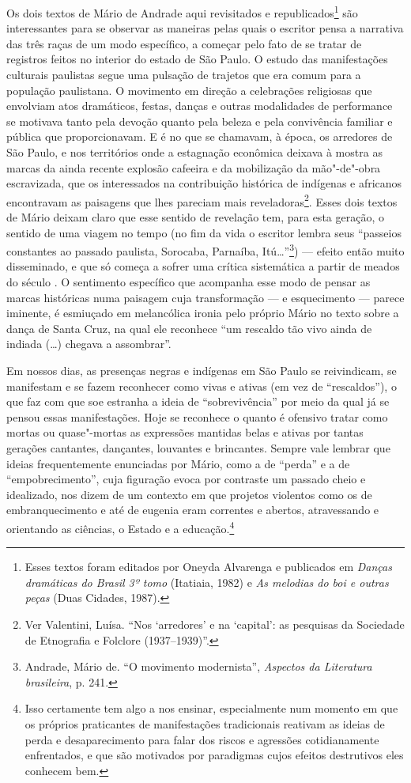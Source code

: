 Os dois textos de Mário de Andrade aqui revisitados e
republicados\footnote{Esses textos foram editados por Oneyda Alvarenga e
  publicados em \emph{Danças dramáticas do Brasil 3º tomo} (Itatiaia,
  1982) e \emph{As melodias do boi e outras peças} (Duas Cidades, 1987).}
são interessantes para se observar as maneiras pelas quais o escritor
pensa a narrativa das três raças de um modo específico, a começar pelo
fato de se tratar de registros feitos no interior do estado de São
Paulo. O estudo das manifestações culturais paulistas segue uma pulsação
de trajetos que era comum para a população paulistana. O movimento em
direção a celebrações religiosas que envolviam atos dramáticos, festas,
danças e outras modalidades de performance se motivava tanto pela
devoção quanto pela beleza e pela convivência familiar e pública que
proporcionavam. E é no que se chamavam, à época, os arredores de São
Paulo, e nos territórios onde a estagnação econômica deixava à mostra as
marcas da ainda recente explosão cafeeira e da mobilização da
mão"-de"-obra escravizada, que os interessados na contribuição histórica
de indígenas e africanos encontravam as paisagens que lhes pareciam mais
reveladoras\footnote{Ver Valentini, Luísa. ``Nos `arredores' e na
  `capital': as pesquisas da Sociedade de Etnografia e Folclore
  (1937--1939)''.}. Esses dois textos de Mário deixam claro que esse
sentido de revelação tem, para esta geração, o sentido de uma viagem no
tempo (no fim da vida o escritor lembra seus ``passeios constantes ao
passado paulista, Sorocaba, Parnaíba, Itú\ldots{}''\footnote{Andrade, Mário
  de. ``O movimento modernista'', \emph{Aspectos da Literatura
  brasileira}, p. 241.}) --- efeito então muito disseminado, e que só
começa a sofrer uma crítica sistemática a partir de meados do século .
O sentimento específico que acompanha esse modo de pensar as marcas
históricas numa paisagem cuja transformação --- e esquecimento --- parece
iminente, é esmiuçado em melancólica ironia pelo próprio Mário no texto
sobre a dança de Santa Cruz, na qual ele reconhece ``um rescaldo tão
vivo ainda de indiada (\ldots{}) chegava a assombrar''.

Em nossos dias, as presenças negras e indígenas em São Paulo se
reivindicam, se manifestam e se fazem reconhecer como vivas e ativas (em
vez de ``rescaldos''), o que faz com que soe estranha a ideia de
``sobrevivência'' por meio da qual já se pensou essas manifestações.
Hoje se reconhece o quanto é ofensivo tratar como mortas ou quase"-mortas
as expressões mantidas belas e ativas por tantas gerações cantantes,
dançantes, louvantes e brincantes. Sempre vale lembrar que ideias
frequentemente enunciadas por Mário, como a de ``perda'' e a de
``empobrecimento'', cuja figuração evoca por contraste um passado cheio
e idealizado, nos dizem de um contexto em que projetos violentos como os
de embranquecimento e até de eugenia eram
correntes e abertos, atravessando e orientando as ciências, o Estado e a
educação.\footnote{Isso certamente tem algo a nos ensinar, especialmente
  num momento em que os próprios praticantes de manifestações
  tradicionais reativam as ideias de perda e desaparecimento para falar
  dos riscos e agressões cotidianamente enfrentados, e que são motivados
  por paradigmas cujos efeitos destrutivos eles conhecem bem.}

